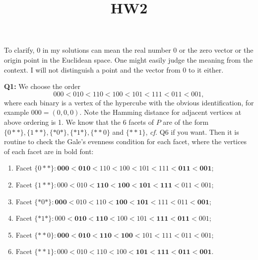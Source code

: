 \documentclass[12pt,reqno]{amsart}
\theoremstyle{definition}
\begin{document}
\title{HW2}

\noindent To clarify, 0 in my solutions can mean the real number 0 or the zero vector or the origin point in the Euclidean space. One might easily judge the meaning from the context. I will not distinguish a point and the vector from 0 to it either.


\vspace{0.2in}

\noindent \textbf{Q1:} We choose the order $$000<010<110<100<101<111<011<001,$$ where each binary is a vertex of the hypercube with the obvious identification, for example $000=(0,0,0)$. Note the Hamming distance for adjacent vertices at above ordering is 1. We know that the 6 facets of $P$ are of the form $\{0**\}, \{1**\}, \{*0*\},\{*1*\}, \{**0\}$ and $\{**1\}$, \emph{cf.} Q6 if you want. Then it is routine to check the Gale's evenness condition for each facet, where the vertices of each facet are in bold font:
\begin{enumerate}
  \item Facet $\{0**\}: \textbf{000}<\textbf{010}<110<100<101<111<\textbf{011}<\textbf{001}$;
  \item Facet $\{1**\}: 000<010<\textbf{110}<\textbf{100}<\textbf{101}<\textbf{111}<011<001$;
  \item Facet $\{*0*\}: \textbf{000}<010<110<\textbf{100}<\textbf{101}<111<011<\textbf{001}$;
  \item Facet $\{*1*\}: 000<\textbf{010}<\textbf{110}<100<101<\textbf{111}<\textbf{011}<001$;
  \item Facet $\{**0\}: \textbf{000}<\textbf{010}<\textbf{110}<\textbf{100}<101<111<011<001$;
  \item Facet $\{**1\}: 000<010<110<100<\textbf{101}<\textbf{111}<\textbf{011}<\textbf{001}$.
\end{enumerate}
\end{document}
